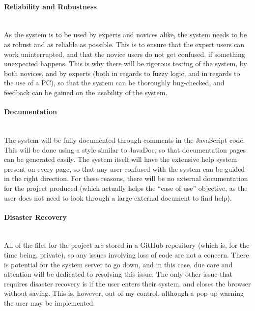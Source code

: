 \paragraph{Reliability and Robustness}\ \\
As the system is to be used by experts and novices alike, the system needs to be as robust and as reliable as possible. This is to ensure that the expert users can work uninterrupted, and that the novice users do not get confused, if something unexpected happens. This is why there will be rigorous testing of the system, by both novices, and by experts (both in regards to fuzzy logic, and in regards to the use of a PC), so that the system can be thoroughly bug-checked, and feedback can be gained on the usability of the system.

\paragraph{Documentation}\ \\
The system will be fully documented through comments in the JavaScript code. This will be done using a style similar to JavaDoc, so that documentation pages can be generated easily. The system itself will have the extensive help system present on every page, so that any user confused with the system can be guided in the right direction. For these reasons, there will be no external documentation for the project produced (which actually helps the ``ease of use'' objective, as the user does not need to look through a large external document to find help).

\paragraph{Disaster Recovery}\ \\
All of the files for the project are stored in a GitHub repository (which is, for the time being, private), so any issues involving loss of code are not a concern. There is potential for the system server to go down, and in this case, due care and attention will be dedicated to resolving this issue. The only other issue that requires disaster recovery is if the user enters their system, and closes the browser without saving. This is, however, out of my control, although a pop-up warning the user may be implemented.
